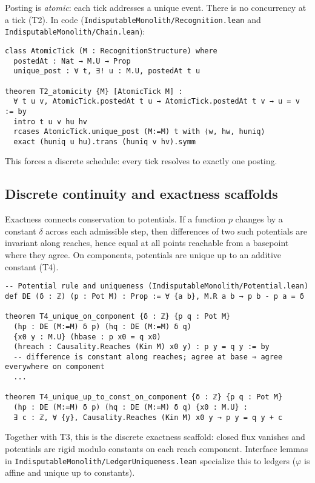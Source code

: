 \documentclass[11pt,a4paper,twoside]{article}
\numberwithin{equation}{section}
\renewcommand{\phi}{\varphi}
\theoremstyle{customthm}
\theoremstyle{customdef}
\theoremstyle{customrem}
\begin{document}
Posting is \emph{atomic}: each tick addresses a unique event. There is no concurrency at a tick (T2). In code (\texttt{IndisputableMonolith/Recognition.lean} and \texttt{IndisputableMonolith/Chain.lean}):

\begin{lstlisting}
class AtomicTick (M : RecognitionStructure) where
  postedAt : Nat → M.U → Prop
  unique_post : ∀ t, ∃! u : M.U, postedAt t u

theorem T2_atomicity {M} [AtomicTick M] :
  ∀ t u v, AtomicTick.postedAt t u → AtomicTick.postedAt t v → u = v := by
  intro t u v hu hv
  rcases AtomicTick.unique_post (M:=M) t with ⟨w, hw, huniq⟩
  exact (huniq u hu).trans (huniq v hv).symm
\end{lstlisting}

This forces a discrete schedule: every tick resolves to exactly one posting.

\subsection{Discrete continuity and exactness scaffolds}

Exactness connects conservation to potentials. If a function $p$ changes by a constant $\delta$ across each admissible step, then differences of two such potentials are invariant along reaches, hence equal at all points reachable from a basepoint where they agree. On components, potentials are unique up to an additive constant (T4).

\begin{lstlisting}
-- Potential rule and uniqueness (IndisputableMonolith/Potential.lean)
def DE (δ : ℤ) (p : Pot M) : Prop := ∀ {a b}, M.R a b → p b - p a = δ

theorem T4_unique_on_component {δ : ℤ} {p q : Pot M}
  (hp : DE (M:=M) δ p) (hq : DE (M:=M) δ q)
  {x0 y : M.U} (hbase : p x0 = q x0)
  (hreach : Causality.Reaches (Kin M) x0 y) : p y = q y := by
  -- difference is constant along reaches; agree at base ⇒ agree everywhere on component
  ...

theorem T4_unique_up_to_const_on_component {δ : ℤ} {p q : Pot M}
  (hp : DE (M:=M) δ p) (hq : DE (M:=M) δ q) {x0 : M.U} :
  ∃ c : ℤ, ∀ {y}, Causality.Reaches (Kin M) x0 y → p y = q y + c
\end{lstlisting}

Together with T3, this is the discrete exactness scaffold: closed flux vanishes and potentials are rigid modulo constants on each reach component. Interface lemmas in \texttt{IndisputableMonolith/LedgerUniqueness.lean} specialize this to ledgers ($\phi$ is affine and unique up to constants).
\end{document}
